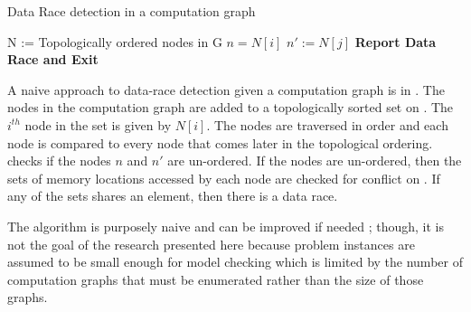 \begin{algorithm}[t]
  \caption{Data Race detection in a computation graph } \label{algo:drd}
\begin{algorithmic}[1]
\State N := Topologically ordered nodes in G \label{loc:topo}
\State $n = N[i]$
\State $n' := N[j]$
  \label{loc:path} \label{loc:forall}
		 \label{loc:intersection}
			\State \textbf{Report Data Race and Exit} \label{loc:datarace}
		\EndIf
\EndIf
 \EndFor
 \EndFor
\EndFunction  
\end{algorithmic}
\end{algorithm}

A naive approach to data-race detection given a computation graph is in . The nodes in the computation graph are added to a topologically sorted set on . The $i^{th}$ node in the set is given by $N[i]$. The nodes are traversed in order and each node is compared to every node that comes later in the topological ordering.  checks if the nodes $n$ and $n'$ are un-ordered. If the nodes are un-ordered, then the sets of memory locations accessed by each node are checked for conflict on . If any of the sets shares an element, then there is a data race.

The algorithm is purposely naive and can be improved if needed \cite{mellor1991fly,raman2012scalable}; though, it is not the goal of the research presented here because problem instances are assumed to be small enough for model checking which is limited by the number of computation graphs that must be enumerated rather than the size of those graphs.

